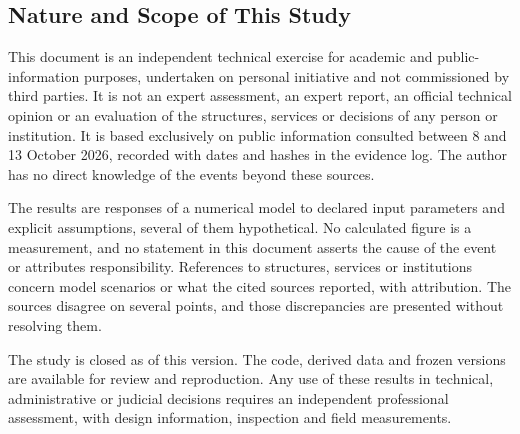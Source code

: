 \subsection*{Nature and Scope of This Study}
This document is an independent technical exercise for academic and public-information purposes, undertaken on personal initiative and not commissioned by third parties. It is not an expert assessment, an expert report, an official technical opinion or an evaluation of the structures, services or decisions of any person or institution. It is based exclusively on public information consulted between 8 and 13 October 2026, recorded with dates and hashes in the evidence log. The author has no direct knowledge of the events beyond these sources.

The results are responses of a numerical model to declared input parameters and explicit assumptions, several of them hypothetical. No calculated figure is a measurement, and no statement in this document asserts the cause of the event or attributes responsibility. References to structures, services or institutions concern model scenarios or what the cited sources reported, with attribution. The sources disagree on several points, and those discrepancies are presented without resolving them.

The study is closed as of this version. The code, derived data and frozen versions are available for review and reproduction. Any use of these results in technical, administrative or judicial decisions requires an independent professional assessment, with design information, inspection and field measurements.
